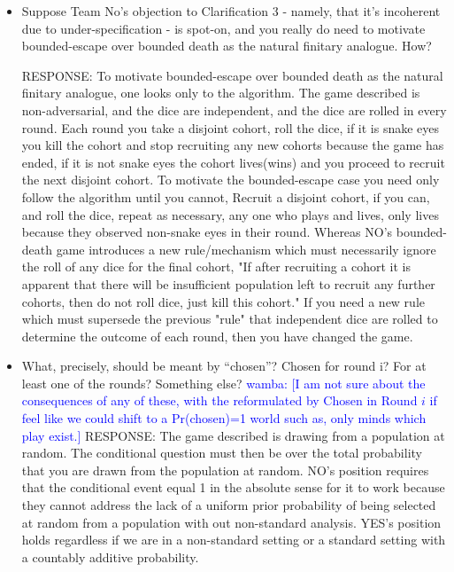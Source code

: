 \documentclass[article,twocolumn]{memoir}
\newcommand{\wamba} [1]{\ifnum\Chatty=1 \textcolor{blue}{wamba:  [#1]} \fi}
\begin{document}
\begin{itemize}
{        The numerator is approaching an infinitesimal quantity in at rate proportional to the the rate the denominator is approaching an infinitesimal quantity.  Their ratio is p.
    }
    
\item Suppose Team No’s objection to Clarification 3 - namely, that it’s incoherent due to under-specification - is spot-on, and you really do need to motivate bounded-escape over bounded death as the natural finitary analogue. How?

    {\color{red}
        RESPONSE: 
        To motivate bounded-escape over bounded death as the natural finitary analogue, one looks only to the algorithm. The game described is non-adversarial, and the dice are independent, and the dice are rolled in every round.  Each round you take a disjoint cohort, roll the dice, if it is snake eyes you kill the cohort and stop recruiting any new cohorts because the game has ended, if it is not snake eyes the cohort lives(wins) and you proceed to recruit the next disjoint cohort.  To motivate the bounded-escape case you need only follow the algorithm until you cannot, Recruit a disjoint cohort, if you can, and roll the dice, repeat as necessary, any one who plays and lives, only lives because they observed non-snake eyes in their round. Whereas NO's bounded-death game introduces a new rule/mechanism which must necessarily ignore the roll of any dice for the final cohort, "If after recruiting a cohort it is apparent that there will be insufficient population left to recruit any further cohorts, then do not roll dice, just kill this cohort."  If you need a new rule which must supersede the previous "rule" that independent dice are rolled to determine the outcome of each round, then you have changed the game.
    }
\item What, precisely, should be meant by “chosen”? Chosen for round i? For at least one of the rounds? Something else?
    \wamba{I am not sure about the consequences of any of these,  with the reformulated by Chosen in Round $i$ if feel like we could shift to a Pr(chosen)=1 world such as, only minds which play exist.}
    {\color{red}
        RESPONSE: 
        The game described is drawing from a population at random. The conditional question must then be over the total probability that you are drawn from the population at random. NO's position requires that the conditional event equal 1 in the absolute sense for it to work because they cannot address the lack of a uniform prior probability of being selected at random from a population with out non-standard analysis.  YES's position holds regardless if we are in a non-standard setting or a standard setting with a countably additive probability.
    }
    

\end{itemize}
\end{document}
